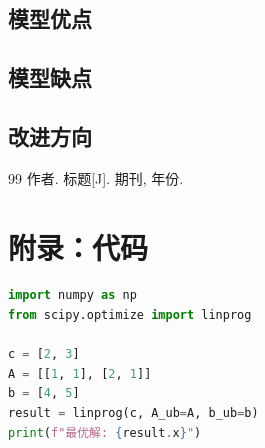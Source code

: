 \documentclass[12pt,a4paper]{article}
\begin{document}
\subsection{模型优点}
\subsection{模型缺点}
\subsection{改进方向}

\begin{thebibliography}{99}
 作者. 标题[J]. 期刊, 年份.
\end{thebibliography}

\appendix
\section{附录：代码}
\begin{lstlisting}[language=Python, caption={求解代码}]
import numpy as np
from scipy.optimize import linprog

c = [2, 3]
A = [[1, 1], [2, 1]]
b = [4, 5]
result = linprog(c, A_ub=A, b_ub=b)
print(f"最优解: {result.x}")
\end{lstlisting}
\end{document}
